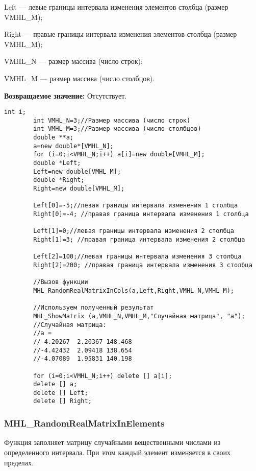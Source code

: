 \documentclass[a4paper,12pt]{article}
\begin{document}
 Left --- левые границы интервала изменения элементов столбца (размер VMHL\_M);
 
 Right --- правые границы интервала изменения элементов столбца (размер VMHL\_M);
 
 VMHL\_N --- размер массива (число строк);
 
 VMHL\_M --- размер массива (число столбцов).

\textbf{Возвращаемое значение:}
Отсутствует.


\begin{lstlisting}[label=code_use_MHL_RandomRealMatrixInCols,caption=Пример использования]
        int i;
        int VMHL_N=3;//Размер массива (число строк)
        int VMHL_M=3;//Размер массива (число столбцов)
        double **a;
        a=new double*[VMHL_N];
        for (i=0;i<VMHL_N;i++) a[i]=new double[VMHL_M];
        double *Left;
        Left=new double[VMHL_M];
        double *Right;
        Right=new double[VMHL_M];

        Left[0]=-5;//левая границы интервала изменения 1 столбца
        Right[0]=-4; //правая граница интервала изменения 1 столбца

        Left[1]=0;//левая границы интервала изменения 2 столбца
        Right[1]=3; //правая граница интервала изменения 2 столбца

        Left[2]=100;//левая границы интервала изменения 3 столбца
        Right[2]=200; //правая граница интервала изменения 3 столбца

        //Вызов функции
        MHL_RandomRealMatrixInCols(a,Left,Right,VMHL_N,VMHL_M);

        //Используем полученный результат
        MHL_ShowMatrix (a,VMHL_N,VMHL_M,"Случайная матрица", "a");
        //Случайная матрица:
        //a =
        //-4.20267	2.20367	148.468
        //-4.42432	2.09418	138.654
        //-4.07089	1.95831	140.198

        for (i=0;i<VMHL_N;i++) delete [] a[i];
        delete [] a;
        delete [] Left;
        delete [] Right;
\end{lstlisting}

\subsubsection{MHL\_RandomRealMatrixInElements}\label{MHL_RandomRealMatrixInElements}

Функция заполняет матрицу случайными вещественными числами из определенного интервала. При этом каждый элемент изменяется в своих пределах.
\end{document}
